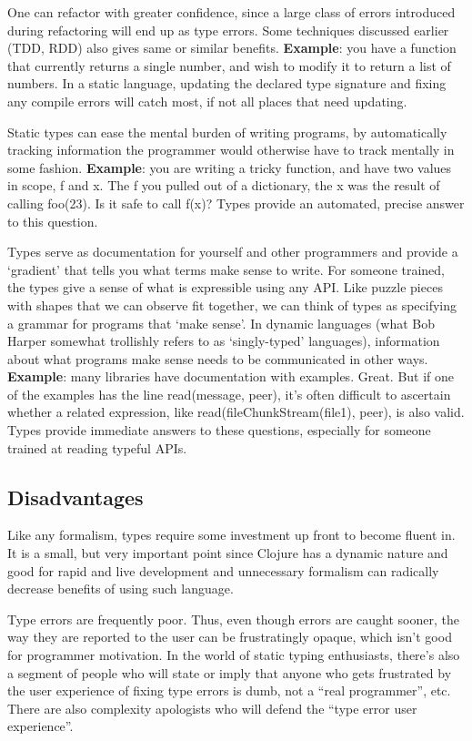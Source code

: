 One can refactor with greater confidence, since a large class of errors
introduced during refactoring will end up as type errors. Some techniques
discussed earlier (TDD, RDD) also gives same or similar benefits.
\textbf{Example}: you have a function that currently returns a single number,
and wish to modify it to return a list of numbers. In a static language,
updating the declared type signature and fixing any compile errors will catch
most, if not all places that need updating.

Static types can ease the mental burden of writing programs, by automatically
tracking information the programmer would otherwise have to track mentally in
some fashion. \textbf{Example}: you are writing a tricky function, and have two
values in scope, f and x. The f you pulled out of a dictionary, the x was the
result of calling foo(23). Is it safe to call f(x)? Types provide an automated,
precise answer to this question.

Types serve as documentation for yourself and other programmers and provide a
‘gradient’ that tells you what terms make sense to write. For someone trained,
the types give a sense of what is expressible using any API. Like puzzle pieces
with shapes that we can observe fit together, we can think of types as
specifying a grammar for programs that ‘make sense’. In dynamic languages (what
Bob Harper somewhat trollishly refers to as ‘singly-typed’ languages),
information about what programs make sense needs to be communicated in other
ways. \textbf{Example}: many libraries have documentation with examples. Great. But if
one of the examples has the line read(message, peer), it’s often difficult to
ascertain whether a related expression, like read(fileChunkStream(file1), peer),
is also valid. Types provide immediate answers to these questions, especially
for someone trained at reading typeful APIs.


\subsection{Disadvantages}

Like any formalism, types require some investment up front to become fluent in.
It is a small, but very important point since Clojure has a dynamic nature and
good for rapid and live development and unnecessary formalism can radically
decrease benefits of using such language.

Type errors are frequently poor. Thus, even though errors are caught sooner, the
way they are reported to the user can be frustratingly opaque, which isn’t good
for programmer motivation. In the world of static typing enthusiasts, there’s
also a segment of people who will state or imply that anyone who gets frustrated
by the user experience of fixing type errors is dumb, not a “real programmer”,
etc. There are also complexity apologists who will defend the “type error user
experience”.


